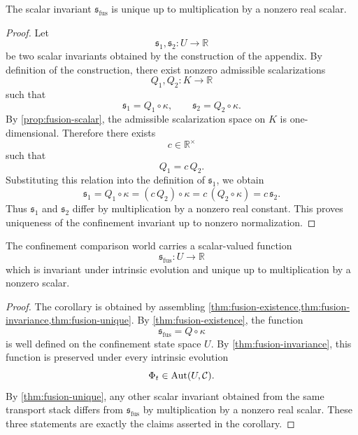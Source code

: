 \begin{theorem}
	\label{thm:fusion-unique}
	The scalar invariant \(\mathfrak s_{\mathrm{fus}}\) is unique up to multiplication by a nonzero
	real scalar.
\end{theorem}
\begin{proof}
	Let
	\[
		\mathfrak s_1,\mathfrak s_2:U\to\mathbb R
	\]
	be two scalar invariants obtained by the construction of the appendix.
	By definition of the construction, there exist nonzero admissible
	scalarizations
	\[
		Q_1,Q_2:K\to\mathbb R
	\]
	such that
	\[
		\mathfrak s_1=Q_1\circ\kappa,
		\qquad
		\mathfrak s_2=Q_2\circ\kappa.
	\]
	By \cref{prop:fusion-scalar}, the admissible scalarization space on \(K\)
	is one-dimensional.
	Therefore there exists
	\[
		c\in\mathbb R^\times
	\]
	such that
	\[
		Q_1=c\,Q_2.
	\]
	Substituting this relation into the definition of \(\mathfrak s_1\), we obtain
	\[
		\mathfrak s_1
		=
		Q_1\circ\kappa
		=
		(c\,Q_2)\circ\kappa
		=
		c\,(Q_2\circ\kappa)
		=
		c\,\mathfrak s_2.
	\]
	Thus \(\mathfrak s_1\) and \(\mathfrak s_2\) differ by multiplication by a nonzero real
	constant.
	This proves uniqueness of the confinement invariant up to nonzero
	normalization.
\end{proof}
\begin{corollary}
	\label{cor:fusion-main}
	The confinement comparison world carries a scalar-valued function
	\[
		\mathfrak s_{\mathrm{fus}}:U\to\mathbb R
	\]
	which is invariant under intrinsic evolution and unique up to
	multiplication by a nonzero scalar.
\end{corollary}
\begin{proof}
	The corollary is obtained by assembling
	\cref{thm:fusion-existence,thm:fusion-invariance,thm:fusion-unique}.
	By \cref{thm:fusion-existence}, the function
	\[
		\mathfrak s_{\mathrm{fus}}=Q\circ\kappa
	\]
	is well defined on the confinement state space \(U\).
	By \cref{thm:fusion-invariance}, this function is preserved under every
	intrinsic evolution
	\[
		\Phi_t\in\operatorname{Aut}(U,\mathcal C).
	\]
	By \cref{thm:fusion-unique}, any other scalar invariant obtained from the
	same transport stack differs from \(\mathfrak s_{\mathrm{fus}}\) by multiplication by a nonzero
	real scalar.
	These three statements are exactly the claims asserted in the corollary.
\end{proof}
